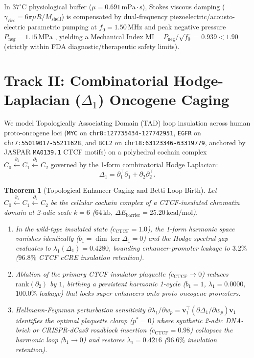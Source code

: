 \documentclass[aps,prx,twocolumn,superscriptaddress,longbibliography,nofootinbib]{revtex4-2}
\newtheorem{theorem}{Theorem}[section]
\begin{document}
In $37^\circ\mathrm{C}$ physiological buffer ($\mu = 0.691\,\mathrm{mPa\cdot s}$), Stokes viscous damping ($\gamma_{\mathrm{visc}} = 6\pi\mu R / M_{\mathrm{shell}}$) is compensated by dual-frequency piezoelectric/acousto-electric parametric pumping at $f_0 = 1.50\,\mathrm{MHz}$ and peak negative pressure $P_{\mathrm{neg}} = 1.15\,\mathrm{MPa}$ \cite{Shapiro2014}, yielding a Mechanical Index $\mathrm{MI} = P_{\mathrm{neg}}/\sqrt{f_0} = 0.939 < 1.90$ (strictly within FDA diagnostic/therapeutic safety limits).

\section{Track II: Combinatorial Hodge-Laplacian ($\Delta_1$) Oncogene Caging}
We model Topologically Associating Domain (TAD) loop insulation \cite{Sanborn2015} across human proto-oncogene loci (\texttt{MYC} on \texttt{chr8:127735434-127742951}, \texttt{EGFR} on \texttt{chr7:55019017-55211628}, and \texttt{BCL2} on \texttt{chr18:63123346-63319779}, anchored by JASPAR \texttt{MA0139.1} CTCF motifs) on a polyhedral cochain complex $C_0 \xleftarrow{\partial_1} C_1 \xleftarrow{\partial_2} C_2$ governed by the 1-form combinatorial Hodge Laplacian:
\begin{equation}
\Delta_1 = \partial_1^\top \partial_1 + \partial_2 \partial_2^\top.
\end{equation}

\begin{theorem}[Topological Enhancer Caging and Betti Loop Birth]
Let $C_0 \xleftarrow{\partial_1} C_1 \xleftarrow{\partial_2} C_2$ be the cellular cochain complex of a CTCF-insulated chromatin domain at 2-adic scale $k = 6$ ($64\,\mathrm{kb}$, $\Delta E_{\mathrm{barrier}} = 25.20\,\mathrm{kcal/mol}$).
\begin{enumerate}
    \item In the wild-type insulated state ($c_{\mathrm{CTCF}} = 1.0$), the 1-form harmonic space vanishes identically ($b_1 = \dim\ker\Delta_1 = 0$) and the Hodge spectral gap evaluates to $\lambda_1(\Delta_1) = 0.4280$, bounding enhancer-promoter leakage to $3.2\%$ ($96.8\%$ CTCF cCRE insulation retention).
    \item Ablation of the primary CTCF insulator plaquette ($c_{\mathrm{CTCF}} \to 0$) reduces $\mathrm{rank}(\partial_2)$ by $1$, birthing a persistent harmonic 1-cycle ($b_1 = 1$, $\lambda_1 = 0.0000$, $100.0\%$ leakage) that locks super-enhancers onto proto-oncogene promoters.
    \item Hellmann-Feynman perturbation sensitivity $\partial\lambda_1/\partial w_p = \bm{v}_1^\top(\partial\Delta_1/\partial w_p)\bm{v}_1$ identifies the optimal plaquette clamp ($p^* = 0$) where synthetic 2-adic DNA-brick or CRISPR-dCas9 roadblock insertion ($c_{\mathrm{CTCF}} = 0.98$) collapses the harmonic loop ($b_1 \to 0$) and restores $\lambda_1 = 0.4216$ ($96.6\%$ insulation retention).
\end{enumerate}
\end{theorem}
\end{document}
